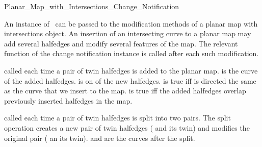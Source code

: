 
\ccRefPageBegin

\begin{ccRefConcept}{Planar_Map_with_Intersections_Change_Notification}

\ccDefinition
   An instance of \ccRefName\ can be passed to the modification
   methods of a planar map with intersections object. An insertion
   of an intersecting curve to a planar map may add several
   halfedges and modify several features of the map. The relevant
   function of the change notification instance is called after
   each such modification.

\ccTypes
{}


  {called each time a pair of twin halfedges is added to the planar map.
   is the curve of the added halfedges.
   is on of the new halfedges.
   is true iff  is directed the same as the curve that we insert to the map.
   is true iff the added halfedges overlap previously inserted halfedges in the map.}

  {called each time a pair of twin halfedges is split into two
  pairs. The split operation creates a new pair of twin halfedges
  ( and its twin) and modifies the original
  pair ( an its twin).
   and  are the curves after the split.
  }


\end{ccRefConcept}
